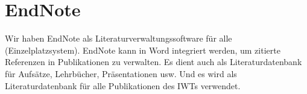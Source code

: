 \section{EndNote}

Wir haben EndNote als Literaturverwaltungssoftware für alle
(Einzelplatzsystem). EndNote kann in Word integriert werden, um zitierte
Referenzen in Publikationen zu verwalten. Es dient auch als Literaturdatenbank
für Aufsätze, Lehrbücher, Präsentationen usw. Und es wird als Literaturdatenbank
für alle Publikationen des IWTs verwendet.
